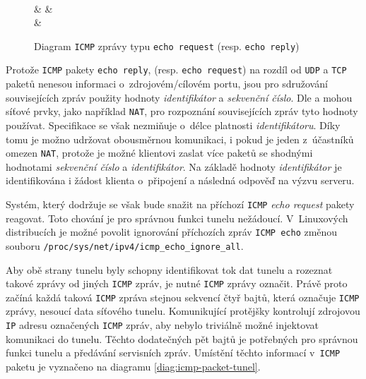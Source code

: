 \documentclass[thesis=M,czech]{FITthesis}[2012/10/20]
\begin{document}
    \begin{figure}[h]
    \centering
	\begin{bytefield}[bitwidth=1em]{32}
	    \\
	     &  & 
	    \\
	     & 
	    \\
	\end{bytefield}
	\caption{Diagram \texttt{ICMP} zprávy typu \texttt{echo request} (resp. \texttt{echo reply})}
	\label{diag:icmp-packet}
    \end{figure}
    
    Protože \texttt{ICMP} pakety \texttt{echo reply}, (resp. \texttt{echo request}) na rozdíl od \texttt{UDP} a \texttt{TCP} paketů nenesou informaci o~zdrojovém/cílovém portu, jsou pro sdružování souvisejících zpráv použity hodnoty \textit{identifikátor} a \textit{sekvenční číslo}. Dle \cite[RFC 792]{rfc792} a \cite[RFC 3022]{rfc3022} mohou síťové prvky, jako například \texttt{NAT}, pro rozpoznání souvisejících zpráv tyto hodnoty používat. Specifikace se však nezmiňuje o~délce platnosti \textit{identifikátoru}. Díky tomu je možno udržovat obousměrnou komunikaci, i pokud je jeden z~účastníků omezen \texttt{NAT}, protože je možné klientovi  zaslat více paketů se shodnými hodnotami \textit{sekvenční číslo} a \textit{identifikátor}. Na základě hodnoty \textit{identifikátor} je identifikována i žádost klienta o~připojení a následná odpověď na výzvu serveru.
    
    Systém, který dodržuje \cite[RFC1122]{rfc1122} se však bude snažit na příchozí \texttt{ICMP} \textit{echo request} pakety reagovat. Toto chování je pro správnou funkci tunelu nežádoucí. V~Linuxových distribucích je možné povolit ignorování příchozích zpráv \texttt{ICMP echo} změnou souboru \texttt{/proc/sys/net/ipv4/icmp\_echo\_ignore\_all}.
    
    Aby obě strany tunelu byly schopny identifikovat tok dat tunelu a rozeznat takové zprávy od jiných \texttt{ICMP} zpráv, je nutné  \texttt{ICMP} zprávy označit. Právě proto začíná každá taková \texttt{ICMP} zpráva stejnou sekvencí čtyř bajtů, která označuje \texttt{ICMP} zprávy, nesoucí data síťového tunelu. Komunikující protějšky kontrolují zdrojovou \texttt{IP} adresu označených \texttt{ICMP} zpráv, aby nebylo triviálně možné injektovat komunikaci do tunelu. Těchto dodatečných pět bajtů je potřebných pro správnou funkci tunelu a předávání servisních zpráv. Umístění těchto informací v~\texttt{ICMP} paketu je vyznačeno na diagramu \ref{diag:icmp-packet-tunel}.
    
\end{document}
